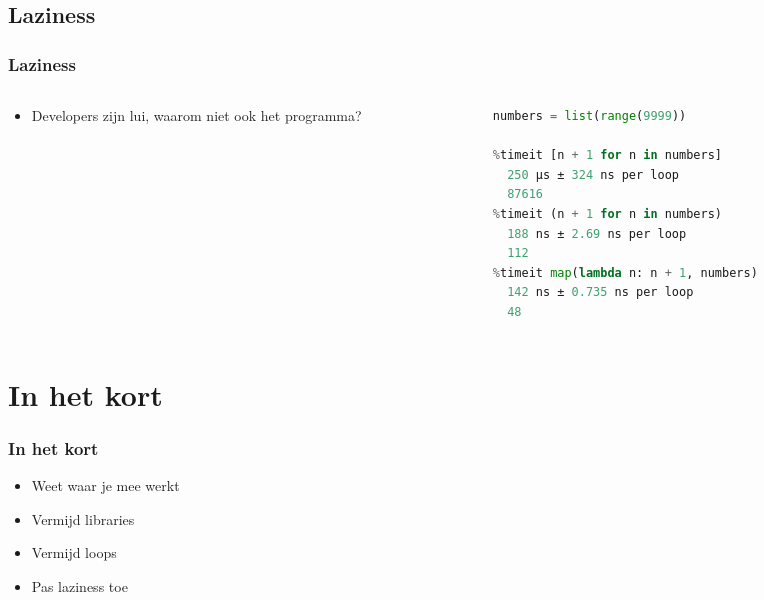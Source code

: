 \documentclass[aspectratio=169]{beamer}
\begin{document}
\subsection{Laziness}
\begin{frame}[fragile]
  \frametitle{Laziness}
  \begin{columns}
    \begin{column}{0.3\textwidth}
      \begin{itemize}
        \item Developers zijn lui, waarom niet ook het programma?
      \end{itemize}
    \end{column}
    \begin{column}{0.7\textwidth}
      \begin{lstlisting}[language=Python, basicstyle=\small]
numbers = list(range(9999))

%timeit [n + 1 for n in numbers]
  250 µs ± 324 ns per loop
  87616
%timeit (n + 1 for n in numbers)
  188 ns ± 2.69 ns per loop
  112
%timeit map(lambda n: n + 1, numbers)
  142 ns ± 0.735 ns per loop
  48
      \end{lstlisting}
    \end{column}
  \end{columns}
\end{frame}

\section{In het kort}
\begin{frame}[fragile]
  \frametitle{In het kort}
  \begin{itemize}
    \item Weet waar je mee werkt
    \item Vermijd libraries
    \item Vermijd loops
    \item Pas laziness toe
  \end{itemize}
\end{frame}
\end{document}
